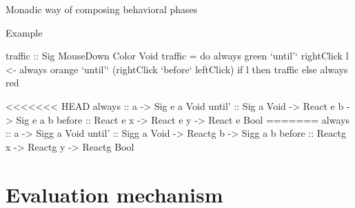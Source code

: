 \documentclass{beamer}
\begin{document}
\begin{frame}{Monadic way of composing behavioral phases}

\begin{block}{Example}
\vspace{-0.4cm}
\begin{center}
\end{center}
\vspace{-0.6cm}


\begin{code}
traffic :: Sig MouseDown Color Void
traffic = 
  do  always green `until'` rightClick
      l <- always orange `until'` (rightClick `before` leftClick)
      if l then traffic else always red
\end{code}
\begin{code}
<<<<<<< HEAD
always  :: a -> Sig e a Void
until'  :: Sig a Void -> React e b -> Sig e a b
before  :: React e x -> React e y -> React e Bool
=======
always  :: a -> Sigg a Void
until'  :: Sigg a Void -> Reactg b -> Sigg a b
before  :: Reactg x -> Reactg y -> Reactg Bool
\end{code}
\setlength{\mathindent}{\tmathindenta}
\vspace{-0.8cm}
\end{block}
\end{frame}


\section{Evaluation mechanism}
\end{document}
